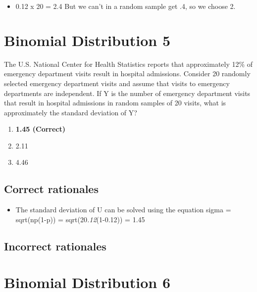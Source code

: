 \documentclass[letterpaper,9pt,twoside,printwatermark=false]{pinp}
\providecommand{\tightlist}{%
  \setlength{\itemsep}{0pt}\setlength{\parskip}{0pt}}
\begin{document}
\begin{itemize}
\tightlist
\item
  0.12 x 20 = 2.4 But we can't in a random sample get .4, so we choose
  2.
\end{itemize}

\hypertarget{binomial-distribution-5}{%
\section{Binomial Distribution 5}\label{binomial-distribution-5}}

The U.S. National Center for Health Statistics reports that
approximately 12\% of emergency department visits result in hospital
admissions. Consider 20 randomly selected emergency department visits
and assume that visits to emergency departments are independent. If Y is
the number of emergency department visits that result in hospital
admissions in random samples of 20 visits, what is approximately the
standard deviation of Y?

\begin{enumerate}
\def\labelenumi{\alph{enumi}.}
\tightlist
\item
  \textbf{1.45 (Correct)}
\item
  2.11
\item
  4.46
\end{enumerate}

\hypertarget{correct-rationales-11}{%
\subsection{Correct rationales}\label{correct-rationales-11}}

\begin{itemize}
\tightlist
\item
  The standard deviation of U can be solved using the equation sigma =
  sqrt(np(1-p)) = sqrt(20\emph{.12}(1-0.12)) = 1.45
\end{itemize}

\hypertarget{incorrect-rationales-11}{%
\subsection{Incorrect rationales}\label{incorrect-rationales-11}}

\hypertarget{binomial-distribution-6}{%
\section{Binomial Distribution 6}\label{binomial-distribution-6}}
\end{document}
